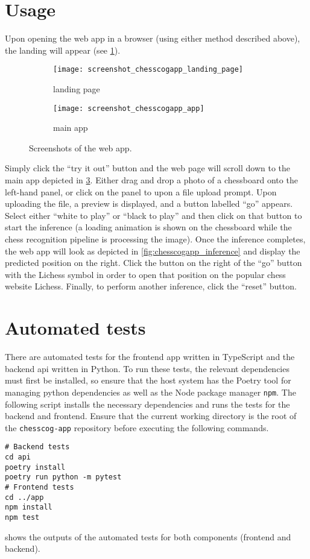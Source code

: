 \documentclass[../../report.tex]{subfiles}
\begin{document}
\section{Usage}
Upon opening the web app in a browser (using either method described above), the landing will appear (see \cref{fig:chesscogapp_landing_page}).
\begin{figure}
    \centering
    \begin{subfigure}[b]{\textwidth}
        \texttt{[image: screenshot\_chesscogapp\_landing\_page]}
        \caption{landing page}
        \label{fig:chesscogapp_landing_page}
    \end{subfigure}
    \hfill
    \medskip\par
    \begin{subfigure}[b]{\textwidth}
        \texttt{[image: screenshot\_chesscogapp\_app]}
        \caption{main app}
        \label{fig:chesscogapp_main_app}
    \end{subfigure}
    \caption{Screenshots of the web app.}
\end{figure}
Simply click the ``try it out'' button and the web page will scroll down to the main app depicted in \cref{fig:chesscogapp_main_app}.
Either drag and drop a photo of a chessboard onto the left-hand panel, or click on the panel to upon a file upload prompt.
Upon uploading the file, a preview is displayed, and a button labelled ``go'' appears.
Select either ``white to play'' or ``black to play'' and then click on that button to start the inference (a loading animation is shown on the chessboard while the chess recognition pipeline is processing the image).
Once the inference completes, the web app will look as depicted in \cref{fig:chesscogapp_inference} and display the predicted position on the right.
Click the button on the right of the ``go'' button with the Lichess symbol in order to open that position on the popular chess website Lichess.
Finally, to perform another inference, click the ``reset'' button.

\section{Automated tests}
\label{sec:chesscogapp_tests}
There are automated tests for the frontend app written in TypeScript and the backend \gls{api} written in Python.
To run these tests, the relevant dependencies must first be installed, so ensure that the host system has the Poetry tool for managing python dependencies as well as the Node package manager \texttt{npm}.
The following script installs the necessary dependencies and runs the tests for the backend and frontend.
Ensure that the current working directory is the root of the \texttt{chesscog-app} repository before executing the following commands.
\begin{verbatim}
# Backend tests
cd api
poetry install
poetry run python -m pytest
# Frontend tests
cd ../app
npm install
npm test
\end{verbatim}
 shows the outputs of the automated tests for both components (frontend and backend).
\end{document}
